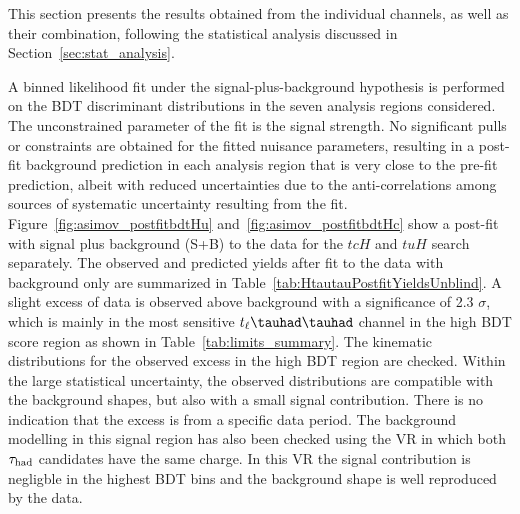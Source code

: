 \documentclass[PAPER, coverpage, atlasdraft=true, texlive=2016, UKenglish]{\ATLASLATEXPATH atlasdoc} %
\begin{document}
This section presents the results obtained from the individual channels, as well as their combination,
following the statistical analysis discussed in Section~\ref{sec:stat_analysis}.

A binned likelihood fit under the signal-plus-background hypothesis is performed on the BDT discriminant distributions in the seven 
analysis regions considered. The unconstrained parameter of the fit is the signal strength.
No significant pulls or constraints are obtained for the fitted nuisance parameters, resulting in a post-fit background prediction in each analysis region that is
very close to the pre-fit prediction, albeit with reduced uncertainties due to the anti-correlations among sources of systematic uncertainty resulting from the fit.
Figure~\ref{fig:asimov_postfitbdtHu} and~\ref{fig:asimov_postfitbdtHc} show a post-fit with signal plus background (S+B) to the data for
the $tcH$ and $tuH$ search separately.
The observed and predicted yields after fit to the data with background only are summarized in Table~\ref{tab:HtautauPostfitYieldsUnblind}.
A slight excess of data is observed above background with a significance of 2.3 $\sigma$, which is mainly in the most sensitive $t_{\ell}\thadhad$ channel in the high BDT score region as shown in
Table~\ref{tab:limits_summary}.
The kinematic distributions for the observed excess in
the high BDT region are checked. Within the large statistical uncertainty, the observed distributions are compatible with the background shapes, but also with a small signal contribution. There is no indication that the excess is from a specific data period.
The background modelling in this signal region has also been checked using the VR in which both $\tau_\text{had}$ candidates have the same charge.
In this VR the signal contribution is negligble in the highest BDT bins and the background shape is well reproduced by the data.
\end{document}
